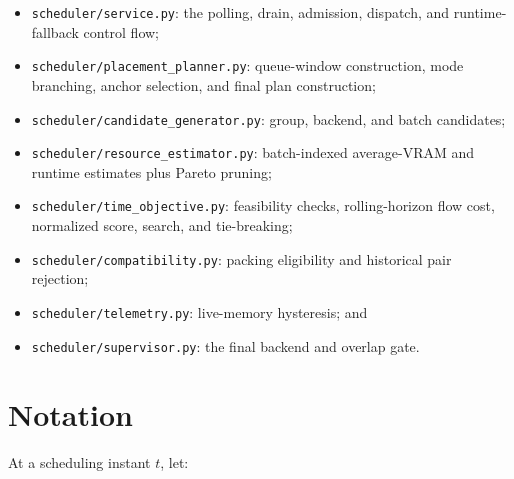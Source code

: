 \documentclass[11pt]{article}
\newcommand{\code}[1]{\textcolor{codeblue}{\texttt{#1}}}
\begin{document}
\begin{itemize}[leftmargin=*]
  \item \code{scheduler/service.py}: the polling, drain, admission, dispatch,
        and runtime-fallback control flow;
  \item \code{scheduler/placement\_planner.py}: queue-window construction,
        mode branching, anchor selection, and final plan construction;
  \item \code{scheduler/candidate\_generator.py}: group, backend, and batch
        candidates;
  \item \code{scheduler/resource\_estimator.py}: batch-indexed average-VRAM and
        runtime estimates plus Pareto pruning;
  \item \code{scheduler/time\_objective.py}: feasibility checks, rolling-horizon
        flow cost, normalized score, search, and tie-breaking;
  \item \code{scheduler/compatibility.py}: packing eligibility and historical
        pair rejection;
  \item \code{scheduler/telemetry.py}: live-memory hysteresis; and
  \item \code{scheduler/supervisor.py}: the final backend and overlap gate.
\end{itemize}

\section{Notation}

At a scheduling instant $t$, let:
\end{document}
